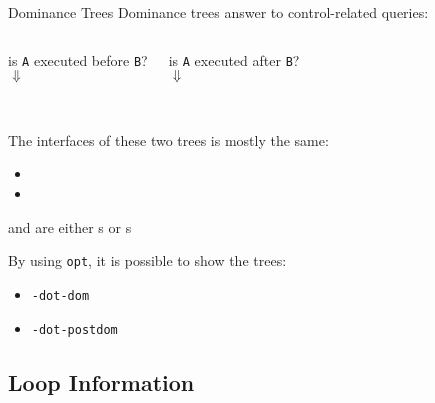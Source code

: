 \begin{frame}{Dominance Trees}
Dominance trees answer to control-related queries:\\

\vfill
\begin{columns}[onlytextwidth]
\begin{centering}
is \texttt{A} executed \alert{before} \texttt{B}?\\
$\Downarrow$\\
\\
\end{centering}

\begin{centering}
is \texttt{A} executed \alert{after} \texttt{B}?\\
$\Downarrow$\\
\\
\end{centering}
\end{columns}

\vfill
The interfaces of these two trees is mostly the same:

\begin{itemize}
\item {}
\item {}
\end{itemize}

 and  are either
s or
s

\vfill
By using \texttt{opt}, it is possible to show the trees:

\begin{itemize}
\item {} \texttt{-dot-dom}
\item {} \texttt{-dot-postdom}
\end{itemize}
\end{frame}


\subsection{Loop Information}


